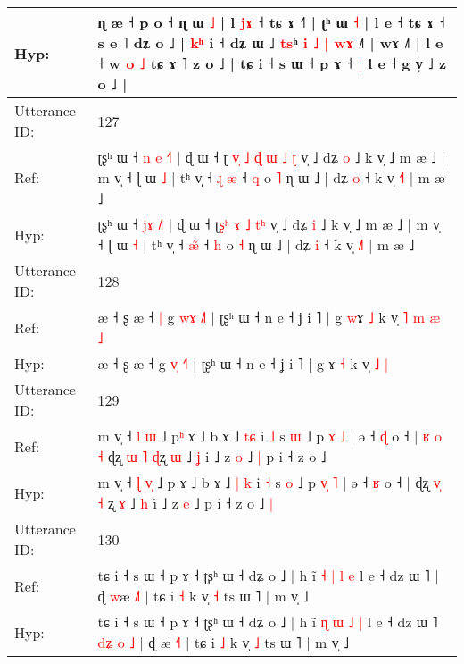 \documentclass[10pt]{article}
\DeclareRobustCommand{\hl}[1]{{\textcolor{red}{#1}}}
\begin{document}
\begin{longtable}{ll}
 \\
Hyp: & ɳ æ ˧ p o ˧ ɳ ɯ \hl{˩} | l \hl{j}\hl{ɤ} ˧ tɕ ɤ ˧˥ | ʈʰ ɯ \hl{}\hl{˧} | l e ˧ tɕ ɤ ˧ s e ˥ dʑ o ˩ | \hl{k}\hl{ʰ} i ˧ dʑ ɯ ˩ \hl{t}\hl{s}ʰ\hl{ }\hl{i}\hl{ }\hl{˩}\hl{ }\hl{|} \hl{w}\hl{ɤ} ˩\hl{˥} | wɤ ˩˥ | l e ˧ w\hl{ }\hl{o} \hl{˩} tɕ ɤ ˥ z o ˩ | tɕ i ˧ s ɯ ˧ p ɤ ˧\hl{ }\hl{|} l e ˧ g v̩ ˩ z o ˩ |
 \\
\midrule
Utterance ID: & 127 \\
Ref: & ʈʂʰ ɯ ˧ \hl{n}\hl{ }\hl{e} \hl{˧}˥ | ɖ ɯ ˧ ʈ\hl{ }\hl{v}\hl{̩}\hl{ }\hl{˩} \hl{ɖ} \hl{ɯ} \hl{˩}\hl{ }\hl{ʈ} v̩ ˩ dʑ \hl{o} ˩ k v̩ ˩ m æ ˩ | m v̩ ˧ ɭ ɯ \hl{˩} | tʰ v̩ ˧ \hl{ɻ}\hl{ }\hl{æ} ˧ \hl{q} o \hl{˥} ɳ ɯ ˩ | dʑ \hl{o} ˧ k v̩ \hl{˧}˥ | m æ ˩
 \\
Hyp: & ʈʂʰ ɯ ˧ \hl{}\hl{j}\hl{ɤ} \hl{˩}˥ | ɖ ɯ ˧ ʈ\hl{}\hl{}\hl{}\hl{ʂ}\hl{ʰ} \hl{ɤ} \hl{˩} \hl{}\hl{t}\hl{ʰ} v̩ ˩ dʑ \hl{i} ˩ k v̩ ˩ m æ ˩ | m v̩ ˧ ɭ ɯ \hl{˧} | tʰ v̩ ˧ \hl{}\hl{æ}\hl{̃} ˧ \hl{h} o \hl{˧} ɳ ɯ ˩ | dʑ \hl{i} ˧ k v̩ \hl{˩}˥ | m æ ˩
 \\
\midrule
Utterance ID: & 128 \\
Ref: & æ ˧ ʂ æ ˧\hl{ }\hl{|} g \hl{w}\hl{ɤ} \hl{˩}˥ | ʈʂʰ ɯ ˧ n e ˧ ʝ i ˥ | g \hl{w}ɤ \hl{˩} k v̩\hl{ }\hl{˥}\hl{ }\hl{m} \hl{æ} \hl{˩}
 \\
Hyp: & æ ˧ ʂ æ ˧\hl{}\hl{} g \hl{v}\hl{̩} \hl{˧}˥ | ʈʂʰ ɯ ˧ n e ˧ ʝ i ˥ | g \hl{}ɤ \hl{˧} k v̩\hl{}\hl{}\hl{}\hl{} \hl{˩} \hl{|}
 \\
\midrule
Utterance ID: & 129 \\
Ref: & m v̩ ˧ \hl{l} \hl{}\hl{ɯ} ˩ p\hl{ʰ} ɤ ˩ b ɤ ˩ \hl{}\hl{t}\hl{ɕ} i \hl{˩} s \hl{ɯ} ˩ p \hl{}\hl{ɤ} \hl{˩} | ə ˧ \hl{ɖ} o ˧ |\hl{ }\hl{ʁ}\hl{ }\hl{o}\hl{ }\hl{˧} ɖʐ \hl{}\hl{ɯ} \hl{˥} \hl{ɖ}ʐ \hl{ɯ} ˩ \hl{ʝ} i\hl{} ˩ z \hl{o} ˩\hl{ }\hl{|} p i ˧ z o ˩\hl{}\hl{}
 \\
Hyp: & m v̩ ˧ \hl{ɭ} \hl{v}\hl{̩} ˩ p\hl{} ɤ ˩ b ɤ ˩ \hl{|}\hl{ }\hl{k} i \hl{˧} s \hl{o} ˩ p \hl{v}\hl{̩} \hl{˥} | ə ˧ \hl{ʁ} o ˧ |\hl{}\hl{}\hl{}\hl{}\hl{}\hl{} ɖʐ \hl{v}\hl{̩} \hl{˧} \hl{}ʐ \hl{ɤ} ˩ \hl{h} i\hl{̃} ˩ z \hl{e} ˩\hl{}\hl{} p i ˧ z o ˩\hl{ }\hl{|}
 \\
\midrule
Utterance ID: & 130 \\
Ref: & tɕ i ˧ s ɯ ˧ p ɤ ˧ ʈʂʰ ɯ ˧ dʑ o ˩ | h ĩ \hl{˧} \hl{|} \hl{l} \hl{e} l e ˧ dz ɯ ˥\hl{}\hl{}\hl{}\hl{}\hl{}\hl{}\hl{} | ɖ \hl{w}æ \hl{˩}˥ | tɕ i \hl{˧} k v̩ \hl{˧} ts ɯ ˥ | m v̩ ˩
 \\
Hyp: & tɕ i ˧ s ɯ ˧ p ɤ ˧ ʈʂʰ ɯ ˧ dʑ o ˩ | h ĩ \hl{ɳ} \hl{ɯ} \hl{˩} \hl{|} l e ˧ dz ɯ ˥\hl{ }\hl{d}\hl{ʑ}\hl{ }\hl{o}\hl{ }\hl{˩} | ɖ \hl{}æ \hl{˧}˥ | tɕ i \hl{˩} k v̩ \hl{˩} ts ɯ ˥ | m v̩ ˩

\end{longtable}
\end{document}
